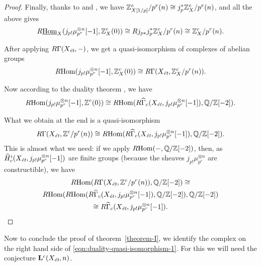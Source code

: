 \documentclass{article}
\numberwithin{equation}{section}
\begin{document}
\begin{proposition}
\begin{proof}
    Finally, thanks to \cite[Theorem~7.2~(a)]{Geisser-2010} and
    \cite[Proposition~2.3]{Geisser-2010}, we have
    $\ZZ^c_{X [1/p]}/p^r (n) \cong j_p^*\ZZ^c_X/p^r (n)$, and all the above
    gives
    \begin{equation}
      R\iHom_X (j_{p!} \mu_{p^r}^{\otimes n} [-1], \ZZ^c_X (0)) \cong
      R j_{p*} j_p^* \ZZ^c_X/p^r (n) \cong \ZZ^c_X/p^r (n).
    \end{equation}

    After applying $R\Gamma (X_\et, -)$, we get a quasi-isomorphism of
    complexes of abelian groups
    \begin{equation}
      \RHom (j_{p!} \mu_{p^r}^{\otimes n} [-1], \ZZ^c_X (0)) \cong
      R\Gamma (X_\et, \ZZ^c_X/p^r (n)).
    \end{equation}

    Now according to the duality theorem \cite[Theorem~7.8]{Geisser-2010},
    we have
    \begin{equation}
      \RHom (j_{p !} \mu_{p^r}^{\otimes n} [-1], \ZZ^c (0)) \cong
      \RHom (R\widehat{\Gamma}_c (X_\et, j_{p !} \mu_{p^r}^{\otimes n} [-1]), \QQ/\ZZ [-2]).
    \end{equation}

    What we obtain at the end is a quasi-isomorphism
    \[ R\Gamma (X_\et, \ZZ^c/p^r (n)) \cong
    \RHom (R\widehat{\Gamma}_c (X_\et, j_{p !} \mu_{p^r}^{\otimes n} [-1]), \QQ/\ZZ [-2]). \]
    This is almost what we need: if we apply $\RHom (-,\QQ/\ZZ [-2])$, then, as
    $\widehat{H}^i_c (X_\et, j_{p!} \mu_{p^r}^{\otimes n} [-1])$ are
    finite groups (because the sheaves $j_{p!} \mu_{p^r}^{\otimes n}$ are
    constructible), we have
    \begin{multline*}
      \RHom (R\Gamma (X_\et, \ZZ^c/p^r (n)), \QQ/\ZZ[-2]) \cong\\
      \RHom (\RHom (R\widehat{\Gamma}_c (X_\et, j_{p !} \mu_{p^r}^{\otimes n} [-1]), \QQ/\ZZ[-2]), \QQ/\ZZ[-2]) \\
      \cong R\widehat{\Gamma}_c (X_\et, j_{p !} \mu_{p^r}^{\otimes n} [-1]). \qedhere
    \end{multline*}
  \end{proof}
\end{proposition}

Now to conclude the proof of theorem~\ref{theorem-I}, we identify the complex
on the right hand side of \eqref{eqn:duality-quasi-isomorphism-1}. For this we
will need the conjecture $\mathbf{L}^c (X_\et, n)$.
\end{document}
